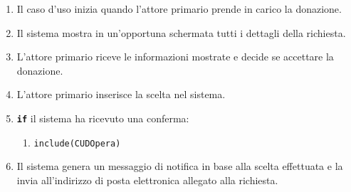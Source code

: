 \documentclass{article}
\begin{document}
	\begin{enumerate}[itemsep=8pt,parsep=0pt]

		\item Il caso d'uso inizia quando l'attore primario prende in carico la donazione.
		\item Il sistema mostra in un'opportuna schermata tutti i dettagli della richiesta.
		\item L'attore primario riceve le informazioni mostrate e decide se accettare la donazione.
		\item L'attore primario inserisce la scelta nel sistema.
		\item \texttt{\textbf{if}} il sistema ha ricevuto una conferma:
		\begin{enumerate}	[leftmargin=28pt]
		\item \texttt{{include(CUDOpera)}}
		\end{enumerate}
		\item Il sistema genera un messaggio di notifica in base alla scelta effettuata e la invia all'indirizzo di posta elettronica allegato alla richiesta.

	\end{enumerate}
	
\end{document}

